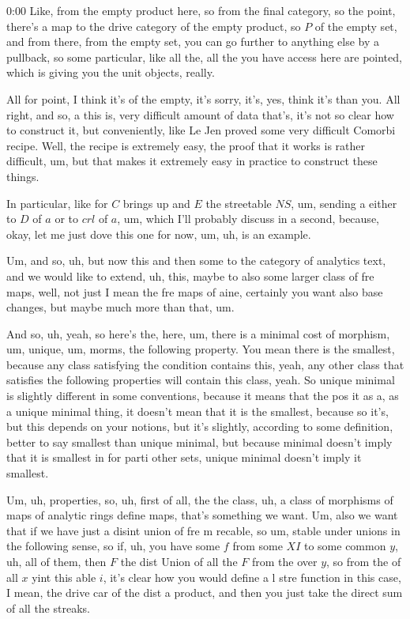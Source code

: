 \begin{unfinished}{0:00}
Like, from the empty product here, so from the final category, so the point, there's a map to the drive category of the empty product, so $P$ of the empty set, and from there, from the empty set, you can go further to anything else by a pullback, so some particular, like all the, all the you have access here are pointed, which is giving you the unit objects, really.

All for point, I think it's of the empty, it's sorry, it's, yes, think it's than you. All right, and so, a this is, very difficult amount of data that's, it's not so clear how to construct it, but conveniently, like Le Jen proved some very difficult Comorbi recipe. Well, the recipe is extremely easy, the proof that it works is rather difficult, um, but that makes it extremely easy in practice to construct these things.

In particular, like for $C$ brings up and $E$ the streetable $NS$, um, sending a either to $D$ of $a$ or to $crl$ of $a$, um, which I'll probably discuss in a second, because, okay, let me just dove this one for now, um, uh, is an example.

Um, and so, uh, but now this and then some to the category of analytics text, and we would like to extend, uh, this, maybe to also some larger class of fre maps, well, not just I mean the fre maps of aine, certainly you want also base changes, but maybe much more than that, um.

And so, uh, yeah, so here's the, here, um, there is a minimal cost of morphism, um, unique, um, morms, the following property. You mean there is the smallest, because any class satisfying the condition contains this, yeah, any other class that satisfies the following properties will contain this class, yeah. So unique minimal is slightly different in some conventions, because it means that the pos it as a, as a unique minimal thing, it doesn't mean that it is the smallest, because so it's, but this depends on your notions, but it's slightly, according to some definition, better to say smallest than unique minimal, but because minimal doesn't imply that it is smallest in for parti other sets, unique minimal doesn't imply it smallest.

Um, uh, properties, so, uh, first of all, the the class, uh, a class of morphisms of maps of analytic rings define maps, that's something we want. Um, also we want that if we have just a disint union of fre m recable, so um, stable under unions in the following sense, so if, uh, you have some $f$ from some $XI$ to some common $y$, uh, all of them, then $F$ the dist Union of all the $F$ from the over $y$, so from the of all $x$ yint this able $i$, it's clear how you would define a l stre function in this case, I mean, the drive car of the dist a product, and then you just take the direct sum of all the streaks.


\end{unfinished}
